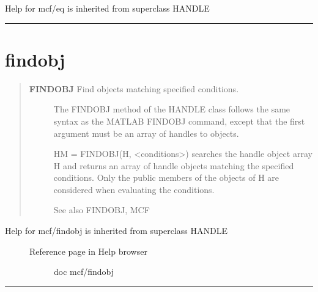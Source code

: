 \documentclass[letterpaper,10pt,english]{sphinxmanual}
\begin{document}
Help for mcf/eq is inherited from superclass HANDLE


\bigskip\hrule{}\bigskip



\section{findobj}
\label{classes/utils/@mcf/mcf:id10}\label{classes/utils/@mcf/mcf:findobj}\begin{quote}
\begin{description}
\item[{\textbf{FINDOBJ}   Find objects matching specified conditions.}] \leavevmode
The FINDOBJ method of the HANDLE class follows the same syntax as the
MATLAB FINDOBJ command, except that the first argument must be an array
of handles to objects.

HM = FINDOBJ(H, \textless{}conditions\textgreater{}) searches the handle object array H and
returns an array of handle objects matching the specified conditions.
Only the public members of the objects of H are considered when
evaluating the conditions.

See also FINDOBJ, MCF

\end{description}
\end{quote}
\begin{description}
\item[{Help for mcf/findobj is inherited from superclass HANDLE}] \leavevmode\begin{description}
\item[{Reference page in Help browser}] \leavevmode
doc mcf/findobj

\end{description}

\end{description}


\bigskip\hrule{}\bigskip
\end{document}
